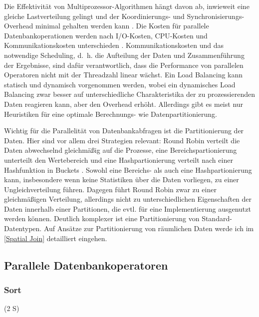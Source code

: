 \documentclass[a4paper,12pt,twoside]{article}
\begin{document}
Die Effektivität von Multiprozessor-Algorithmen hängt davon ab, inwieweit eine gleiche Lastverteilung gelingt und der Koordinierungs- und Synchronisierungs-Overhead minimal gehalten werden kann {\autocite{Lakshmi1990}}. Die Kosten für parallele Datenbankoperationen werden nach I/O-Kosten, CPU-Kosten und Kommunikationskosten unterschieden {\autocite [S. 23]{Yu1998}}. Kommunikationskosten und das notwendige Scheduling, d.~h. die Aufteilung der Daten und Zusammenführung der Ergebnisse, sind dafür verantwortlich, dass die Performance von parallelen Operatoren nicht mit der Threadzahl linear wächst. Ein Load Balancing kann statisch und dynamisch vorgenommen werden, wobei ein dynamisches Load Balancing zwar besser auf unterschiedliche Charakteristika der zu prozessierenden Daten reagieren kann, aber den Overhead erhöht. Allerdings gibt es meist nur Heuristiken für eine optimale Berechnungs- wie Datenpartitionierung.

Wichtig für die Parallelität von Datenbankabfragen ist die Partitionierung der Daten. Hier sind vor allem drei Strategien relevant: Round Robin verteilt die Daten abwechselnd gleichmäßig auf die Prozesse, eine Bereichspartionierung unterteilt den Wertebereich und eine Hashpartionierung verteilt nach einer Hashfunktion in Buckets {\autocite{Yu1998}}. Sowohl eine Bereichs- als auch eine Hashpartionierung kann, insbesondere wenn keine Statistiken über die Daten vorliegen, zu einer Ungleichverteilung führen. Dagegen führt Round Robin zwar zu einer gleichmäßigen Verteilung, allerdings nicht zu unterschiedlichen Eigenschaften der Daten innerhalb einer Partitionen, die evtl. für eine Implementierung ausgenutzt werden können. Deutlich komplexer ist eine Partitionierung von Standard-Datentypen. Auf Ansätze zur Partitionierung von räumlichen Daten werde ich im \autoref{Spatial Join} detailliert eingehen. 


\subsection{Parallele Datenbankoperatoren}

\subsubsection{Sort} (2 S)
\label{Sort} 
\end{document}
